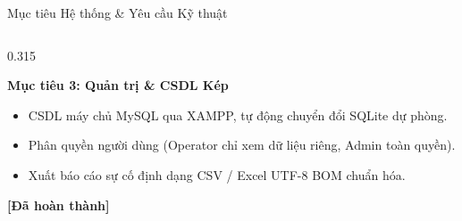 \documentclass[aspectratio=169, 11pt]{beamer}
\begin{document}
\begin{frame}{Mục tiêu Hệ thống \& Yêu cầu Kỹ thuật}
\begin{columns}[T, onlytextwidth]
    \begin{column}{0.315\textwidth}
      \begin{tcolorbox}[
        enhanced, colback=white, colframe=DarkMain, boxrule=0.9pt, arc=3.2pt,
        top=4pt, bottom=4pt, left=5pt, right=5pt
      ]
        {\fontsize{8.2pt}{9.8pt}\selectfont\bfseries\color{DarkMain} Mục tiêu 3: Quản trị \& CSDL Kép}\\[3pt]
        {\fontsize{7.0pt}{8.8pt}\selectfont
        \begin{itemize}
          \item CSDL máy chủ MySQL qua XAMPP, tự động chuyển đổi SQLite dự phòng.
          \item Phân quyền người dùng (Operator chỉ xem dữ liệu riêng, Admin toàn quyền).
          \item Xuất báo cáo sự cố định dạng CSV / Excel UTF-8 BOM chuẩn hóa.
        \end{itemize}}
        \vspace{2pt}
        \hfill{\fontsize{7.0pt}{8.5pt}\selectfont\textbf{\color{DarkMain}[Đã hoàn thành]}}
      \end{tcolorbox}
    \end{column}
  \end{columns}
\end{frame}
\end{document}
